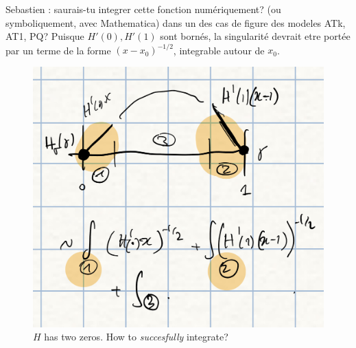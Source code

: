 \documentclass[]{article}
\begin{document}
Sebastien : saurais-tu integrer cette fonction numériquement? (ou symboliquement, avec Mathematica)
dans un des cas de figure des modeles ATk, AT1, PQ?
Puisque $H'(0), H'(1)$ sont bornés, la singularité devrait etre portée par un terme de la forme $({x-x_0})^{-1/2}$, integrable autour de $x_0$.

\begin{figure}[htbp]
  \begin{center}
  \includegraphics[width=.5\textwidth]{../figures/H-heuristics.jpeg}
  \caption{$H$ has two zeros. How to \emph{succesfully} integrate?}
  \label{fig:class-analyser}
  \end{center}
\end{figure}
\end{document}
